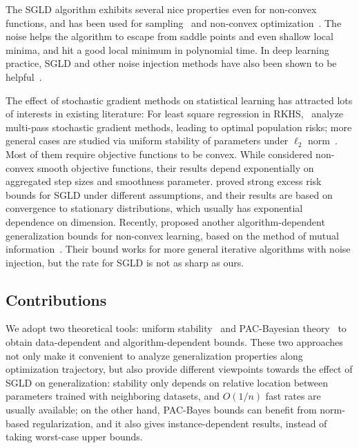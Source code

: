\documentclass[final,12pt]{colt2018} %
\begin{document}
The SGLD algorithm exhibits several nice properties even for non-convex functions, and has been used for sampling~\citep{bubeck2015sampling,nagapetyan2017true,dalalyan2017theoretical,cheng2017underdamped,cheng2017convergence} and non-convex optimization~\citep{raginsky2017non,zhang2017hitting}. The noise helps the algorithm to escape from saddle points and even shallow local minima, and hit a good local minimum in polynomial time. In deep learning practice, SGLD and other noise injection methods have also been shown to be helpful~\citep{neelakantan2015adding,chaudhari2016entropy,ye2017langevin,zhang2017theory}.

The effect of stochastic gradient methods on statistical learning has attracted lots of interests in existing literature: For least square regression in RKHS,~\citep{lin2016optimal,lin2016generalization} analyze multi-pass stochastic gradient methods, leading to optimal population risks; more general cases are studied via uniform stability of parameters under $\ell_2$ norm~\citep{hardt2015train,london2016generalization}. Most of them require objective functions to be convex. While \citet{hardt2015train} considered non-convex smooth objective functions, their results depend exponentially on aggregated step sizes and smoothness parameter. \citet{raginsky2017non} proved strong excess risk bounds for SGLD under different assumptions, and their results are based on convergence to stationary distributions, which usually has exponential dependence on dimension. Recently, \citet{pensia2018generalization} proposed another algorithm-dependent generalization bounds for non-convex learning, based on the method of mutual information~\citep{xu2017information}. Their bound works for more general iterative algorithms with noise injection, but the rate for SGLD is not as sharp as ours.
\subsection{Contributions}
 We adopt two theoretical tools: uniform stability~\citep{elisseeff2005stability,rakhlin2005stability} and PAC-Bayesian theory~\citep{mcallester2003pac,germain2016pac} to obtain data-dependent and algorithm-dependent bounds. These two approaches not only make it convenient to analyze generalization properties along optimization trajectory, but also provide different viewpoints towards the effect of SGLD on generalization: stability only depends on relative location between parameters trained with neighboring datasets, and $O(1/n)$ fast rates are usually available; on the other hand, PAC-Bayes bounds can benefit from norm-based regularization, and it also gives instance-dependent results, instead of taking worst-case upper bounds.
\end{document}
